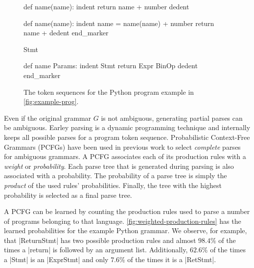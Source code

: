 \begin{figure}[t]
\centering
\begin{minipage}[t]{0.56\linewidth}
\centering
\begin{ecode}
def name(name): \n
indent return name + number \n
dedent \n

def name(name): \n
indent name = name(name) + number \n
return name + \n
dedent end_marker
\end{ecode}
\label{fig:prog-seq}
\end{minipage}%
\hspace{0.02\linewidth}%
\begin{minipage}[t]{0.42\linewidth}
\centering
\begin{ecode}
Stmt \n

def name Params: \n
indent Stmt \n
return Expr BinOp \n
dedent end_marker
\end{ecode}
\label{fig:abstract-prog-seq}
\end{minipage}
\caption{The token sequences for the Python program example in \autoref{fig:example-prog}.}
\end{figure}

Even if the original grammar $G$ is not ambiguous, generating partial parses can
be ambiguous. Earley parsing is a dynamic programming technique and internally
keeps all possible parses for a program token sequence. Probabilistic
Context-Free Grammars (PCFGs) have been used in previous work
\citep{Collins_2013, Jelinek_1992} to select \emph{complete} parses for
ambiguous grammars. A PCFG associates each of its production rules with a
\emph{weight} or \emph{probability}. Each parse tree that is generated during
parsing is also associated with a probability. The probability of a parse tree
is simply the \emph{product} of the used rules' probabilities. Finally, the tree
with the highest probability is selected as a final parse tree.

A PCFG can be learned \citep{Collins_2013} by counting the production
rules used to parse a number of programs belonging to that language.
\autoref{fig:weighted-production-rules} has the learned probabilities for the
example Python grammar. We observe, for example, that |ReturnStmt| has two
possible production rules and almost $98.4\%$ of the times a |return| is
followed by an argument list. Additionally, $62.6\%$ of the times a |Stmt| is an
|ExprStmt| and only $7.6\%$ of the times it is a |RetStmt|.

